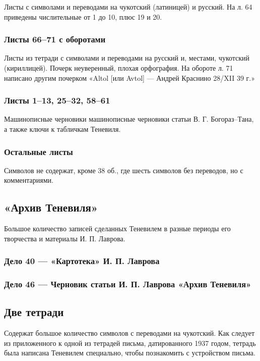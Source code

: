 \documentclass{article}
\begin{document}
Листы с символами и переводами на чукотский (латиницей) и русский. На л. 64 приведены числительные от 1 до 10, плюс 19 и 20.

\subsubsection{Листы 66–71 с оборотами}

Листы из тетради с символами и переводами на русский и, местами, чукотский (кириллицей). Почерк неуверенный, плохая орфография. На обороте л. 71 написано другим почерком «Altol [или Avtol] — Андрей Краснино 28/XII 39 г.»

\subsubsection{Листы 1–13, 25–32, 58–61}
Машинописные черновики машинописные черновики статьи В. Г. Богораз–Тана, а также ключи к табличкам Теневиля.

\subsubsection{Остальные листы}

Символов не содержат, кроме 38 об., где шесть символов без переводов, но с комментариями.

\subsection{«Архив Теневиля»}

Большое количество записей сделанных Теневилем в разные периоды его творчества и материалы И. П. Лаврова.

\subsubsection{Дело 40 — «Картотека» И. П. Лаврова}

\subsubsection{Дело 46 — Черновик статьи И. П. Лаврова «Архив Теневиля» }

\subsection{Две тетради}

Содержат большое количество символов с переводами на чукотский. Как следует из приложенного к одной из тетрадей письма, датированного 1937 годом, тетрадь была написана Теневилем специально, чтобы познакомить с устройством письма. 
\end{document}
